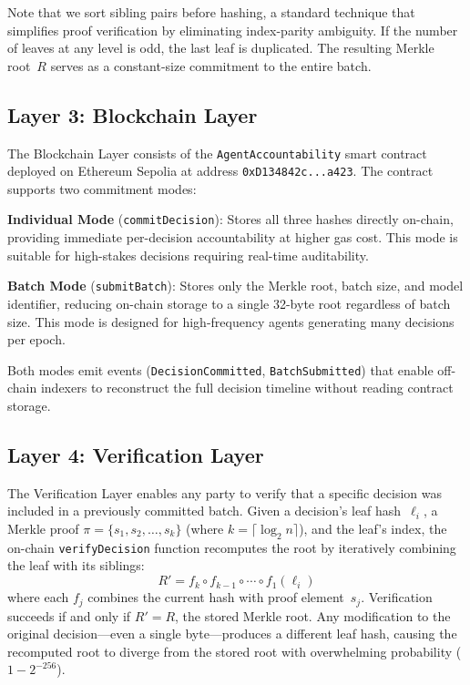 \documentclass[manuscript,nonacm]{acmart}
\begin{document}
Note that we sort sibling pairs before hashing, a standard technique that simplifies proof verification by eliminating index-parity ambiguity.
If the number of leaves at any level is odd, the last leaf is duplicated.
The resulting Merkle root~$R$ serves as a constant-size commitment to the entire batch.

\subsection{Layer 3: Blockchain Layer}

The Blockchain Layer consists of the \texttt{AgentAccountability} smart contract deployed on Ethereum Sepolia at address \texttt{0xD134842c...a423}.
The contract supports two commitment modes:

\textbf{Individual Mode} (\texttt{commitDecision}): Stores all three hashes directly on-chain, providing immediate per-decision accountability at higher gas cost.
This mode is suitable for high-stakes decisions requiring real-time auditability.

\textbf{Batch Mode} (\texttt{submitBatch}): Stores only the Merkle root, batch size, and model identifier, reducing on-chain storage to a single 32-byte root regardless of batch size.
This mode is designed for high-frequency agents generating many decisions per epoch.

Both modes emit events (\texttt{DecisionCommitted}, \texttt{BatchSubmitted}) that enable off-chain indexers to reconstruct the full decision timeline without reading contract storage.

\subsection{Layer 4: Verification Layer}

The Verification Layer enables any party to verify that a specific decision was included in a previously committed batch.
Given a decision's leaf hash~$\ell_i$, a Merkle proof $\pi = \{s_1, s_2, \ldots, s_k\}$ (where $k = \lceil \log_2 n \rceil$), and the leaf's index, the on-chain \texttt{verifyDecision} function recomputes the root by iteratively combining the leaf with its siblings:
\begin{equation}
R' = f_k \circ f_{k-1} \circ \cdots \circ f_1(\ell_i)
\end{equation}
where each $f_j$ combines the current hash with proof element~$s_j$.
Verification succeeds if and only if $R' = R$, the stored Merkle root.
Any modification to the original decision---even a single byte---produces a different leaf hash, causing the recomputed root to diverge from the stored root with overwhelming probability ($1 - 2^{-256}$).
\end{document}

